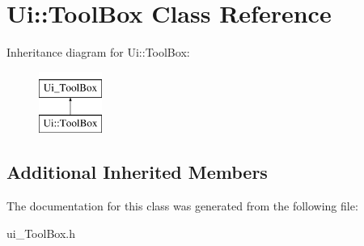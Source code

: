 \hypertarget{class_ui_1_1_tool_box}{\section{Ui\-:\-:Tool\-Box Class Reference}
\label{class_ui_1_1_tool_box}
}
Inheritance diagram for Ui\-:\-:Tool\-Box\-:\begin{figure}[H]
\begin{center}
\leavevmode
\includegraphics[height=2.000000cm]{class_ui_1_1_tool_box}
\end{center}
\end{figure}
\subsection*{Additional Inherited Members}


The documentation for this class was generated from the following file\-:\begin{DoxyCompactItemize}
\item 
ui\-\_\-\-Tool\-Box.\-h\end{DoxyCompactItemize}
